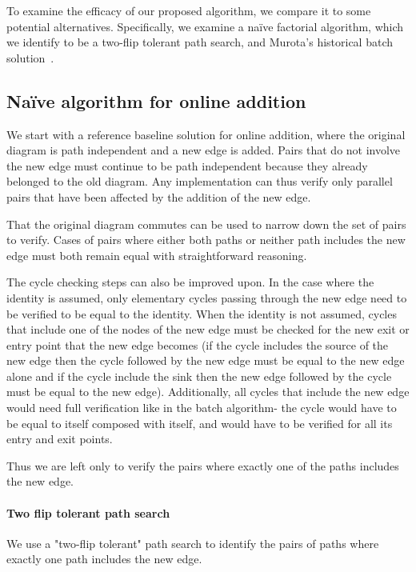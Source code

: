 \documentclass[sigplan,review,anonymous]{acmart}
\begin{document}
To examine the efficacy of our proposed algorithm, we compare it to some potential alternatives.  Specifically, we examine a na\"{i}ve factorial algorithm, which we identify to be a two-flip tolerant path search, and Murota's historical batch solution~\cite{commutative}.

\subsection{Na\"{i}ve algorithm for online addition}

We start with a reference baseline solution for online addition, where the original diagram is path independent and a new edge is added. Pairs that do not involve the new edge must continue to be path independent because they already belonged to the old diagram.   Any implementation can thus verify only parallel pairs that have been affected by the addition of the new edge.

That the original diagram commutes can be used to narrow down the set of pairs to verify.  Cases of pairs where either both paths or neither path includes the new edge must both remain equal with straightforward reasoning.

The cycle checking steps can also be improved upon. In the case where the identity is assumed, only elementary cycles passing through the new edge need to be verified to be equal to the identity. When the identity is not assumed, cycles that include one of the nodes of the new edge must be checked for the new exit or entry point that the new edge becomes (if the cycle includes the source of the new edge then the cycle followed by the new edge must be equal to the new edge alone and if the cycle include the sink then the new edge followed by the cycle must be equal to the new edge).
Additionally, all cycles that include the new edge would need full verification like in the batch algorithm- the cycle would have to be equal to itself composed with itself, and would have to be verified for all its entry and exit points.

Thus we are left only to verify the pairs where exactly one of the paths includes the new edge.

\paragraph{Two flip tolerant path search}
We use a "two-flip tolerant" path search to identify the pairs of paths where exactly one path includes the new edge. 
\end{document}
